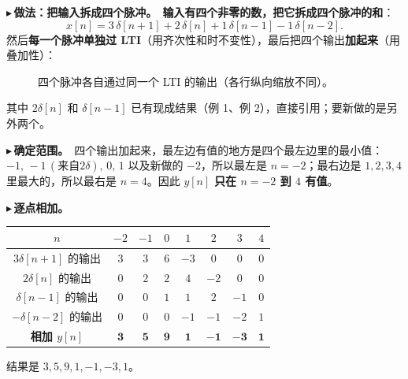 \documentclass[UTF8,a4paper,11pt]{ctexart}
\newcommand{\stemr}[7]{%
  \begin{scope}[shift={(#1,#2)},x=0.38cm,y=#5 cm]
    \pgfmathtruncatemacro{\len}{dim({#4,0})-1}%
    \pgfmathtruncatemacro{\ymax}{max(#4,#4)}%
    \pgfmathtruncatemacro{\ymin}{min(#4,#4)}%
    \pgfmathsetmacro{\ybot}{min(-0.45/#5,\ymin-0.12/#5)}%
    \draw[->] ({#6-0.5},0) -- ({#7+0.7},0) node[right,font=\tiny] {$n$};
    \draw[->] (0,\ybot) -- (0,{1.9/#5});
    \foreach \v [count=\k from 0] in {#4}{%
      \pgfmathtruncatemacro{\nn}{#3+\k}
      \draw[thick,blue!60!black] (\nn,0) -- (\nn,\v);
      \node[circle,fill=blue!60!black,inner sep=1.1pt] at (\nn,\v) {};
      \ifnum\nn<0 \def\side{east}\else\def\side{west}\fi
      \ifnum\v>0 \node[font=\scriptsize,anchor=south \side,inner sep=1pt] at (\nn,\v) {\v};\fi
      \ifnum\v<0 \node[font=\scriptsize,anchor=north \side,inner sep=1pt] at (\nn,\v) {\v};\fi}%
    \foreach \t in {#6,...,#7}{%
      \pgfmathtruncatemacro{\kk}{\t-(#3)}%
      \def\vv{0}%
      \ifnum\kk>-1 \ifnum\kk<\len\relax \pgfmathtruncatemacro{\vv}{{#4,0}[\kk]}\fi\fi
      \draw (\t,0) -- (\t,{-0.09/#5});
      \ifnum\vv<0
        \node[font=\tiny,gray!60!black,anchor=south,fill=white,inner sep=0.6pt] at (\t,{0.04/#5}) {$\t$};
      \else
        \node[font=\tiny,gray!60!black,anchor=north,fill=white,inner sep=0.6pt] at (\t,{-0.09/#5}) {$\t$};
      \fi}%
    \ifnum\ymax>0
      \draw (0,\ymax) -- (-0.2,\ymax) node[anchor=east,font=\tiny,gray!60!black,fill=white,inner sep=0.6pt] {$\ymax$};
    \fi
    \pgfmathtruncatemacro{\showmin}{(\ymin*#5)<-0.33}%
    \ifnum\showmin=1
      \draw (0,\ymin) -- (-0.2,\ymin) node[anchor=east,font=\tiny,gray!60!black,fill=white,inner sep=0.6pt] {$\ymin$};
    \fi
  \end{scope}}
\newcommand{\stemat}[5]{\stemr{#1}{#2}{#3}{#4}{#5}{-3}{5}}
\newcommand{\ltirow}[9]{%
  \node[anchor=east,font=\footnotesize] at (2.9,{#1+0.7}) {#7};
  \stemat{4.6}{#1}{#2}{#3}{#6}
  \draw[->,thick] (6.9,{#1+0.5}) -- (7.9,{#1+0.5});
  \node[font=\footnotesize,above] at (7.4,{#1+0.5}) {LTI};
  \stemat{10.6}{#1}{#4}{#5}{#9}
  \node[anchor=west,font=\footnotesize,text width=2.4cm] at (12.9,{#1+0.7}) {#8};}
\newcommand{\ltiq}[5]{%
  \node[anchor=east,font=\footnotesize] at (2.9,{#1+0.7}) {#5};
  \stemat{4.6}{#1}{#2}{#3}{#4}
  \draw[->,thick] (6.9,{#1+0.5}) -- (7.9,{#1+0.5});
  \node[font=\footnotesize,above] at (7.4,{#1+0.5}) {LTI};
  \node[font=\large] at (9.4,{#1+0.5}) {$y[n]=\,?$};}
\newcounter{ex}[section]
\newcommand{\point}[1]{\par\addvspace{1ex}\noindent\textcolor{ptteal}{$\blacktriangleright$\,\textbf{#1}}\ }
\renewcommand{\paragraph}[1]{\point{#1}}
\begin{document}
\begin{figure}[H]
\centering
{}
\end{figure}

\point{做法：把输入拆成四个脉冲。}\textbf{输入有四个非零的数，把它拆成四个脉冲的和}：
\[x[n]=3\,\delta[n+1]+2\,\delta[n]+1\,\delta[n-1]-1\,\delta[n-2].\]
然后\textbf{每一个脉冲单独过 LTI}（用齐次性和时不变性），最后把四个输出\textbf{加起来}（用叠加性）：

\begin{figure}[H]
\centering
{}
\caption{四个脉冲各自通过同一个 LTI 的输出（各行纵向缩放不同）。}
\end{figure}

其中 $2\delta[n]$ 和 $\delta[n-1]$ 已有现成结果（例 1、例 2），直接引用；要新做的是另外两个。

\paragraph{确定范围。}四个输出加起来，最左边有值的地方是四个最左边里的最小值：$-1,\,-1\,(\text{来自}2\delta),\,0,\,1$ 以及新做的 $-2$，所以最左是 $n=-2$；最右边是 $1,2,3,4$ 里最大的，所以最右是 $n=4$。因此 $y[n]$ \textbf{只在 $n=-2$ 到 $4$ 有值}。

\paragraph{逐点相加。}

\begin{center}
\begin{tabular}{@{}c|ccccccc@{}}
\toprule
$n$ & $-2$ & $-1$ & $0$ & $1$ & $2$ & $3$ & $4$\\
\midrule
$3\delta[n+1]$ 的输出 & $3$ & $3$ & $6$ & $-3$ & $0$ & $0$ & $0$\\
$2\delta[n]$ 的输出 & $0$ & $2$ & $2$ & $4$ & $-2$ & $0$ & $0$\\
$\delta[n-1]$ 的输出 & $0$ & $0$ & $1$ & $1$ & $2$ & $-1$ & $0$\\
$-\delta[n-2]$ 的输出 & $0$ & $0$ & $0$ & $-1$ & $-1$ & $-2$ & $1$\\
\midrule
\textbf{相加 $y[n]$} & $\mathbf{3}$ & $\mathbf{5}$ & $\mathbf{9}$ & $\mathbf{1}$ & $\mathbf{-1}$ & $\mathbf{-3}$ & $\mathbf{1}$\\
\bottomrule
\end{tabular}
\end{center}
结果是 $3,5,9,1,-1,-3,1$。
\end{document}
